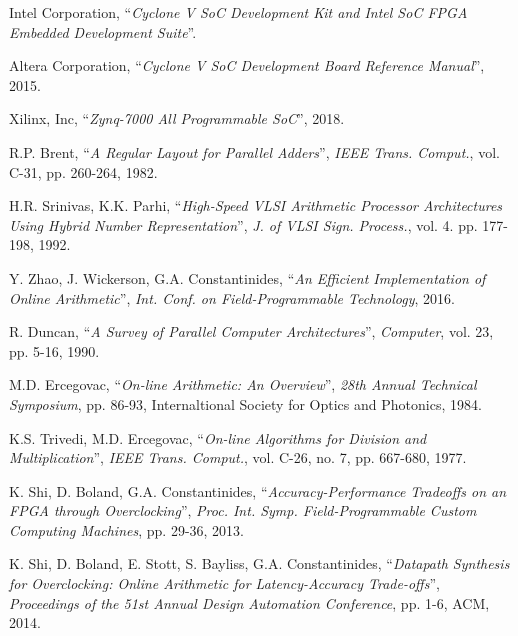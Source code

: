 \documentclass[journal]{IEEEtran}
\begin{document}
\begin{thebibliography}{1}

  Intel Corporation,
  ``\textit{Cyclone V SoC Development Kit and Intel SoC FPGA Embedded
  Development Suite}''.

  Altera Corporation,
  ``\textit{Cyclone V SoC Development Board Reference Manual}'',
  2015.

  Xilinx, Inc,
  ``\textit{Zynq-7000 All Programmable SoC}'',
  2018.

  R.P. Brent,
  ``\textit{A Regular Layout for Parallel Adders}'',
  \textit{IEEE Trans. Comput.}, vol. C-31, pp. 260-264,
  1982.

  H.R. Srinivas, K.K. Parhi,
  ``\textit{High-Speed VLSI Arithmetic Processor Architectures Using Hybrid
  Number Representation}'',
  \textit{J. of VLSI Sign. Process.}, vol. 4. pp. 177-198,
  1992.

  Y. Zhao, J. Wickerson, G.A. Constantinides,
  ``\textit{An Efficient Implementation of Online Arithmetic}'',
  \textit{Int. Conf. on Field-Programmable Technology},
  2016.

  R. Duncan,
  ``\textit{A Survey of Parallel Computer Architectures}'',
  \textit{Computer}, vol. 23, pp. 5-16,
  1990.

  M.D. Ercegovac,
  ``\textit{On-line Arithmetic: An Overview}'',
  \textit{28th Annual Technical Symposium}, pp. 86-93,
  Internaltional Society for Optics and Photonics,
  1984.

  K.S. Trivedi, M.D. Ercegovac,
  ``\textit{On-line Algorithms for Division and Multiplication}'',
  \textit{IEEE Trans. Comput.}, vol. C-26, no. 7, pp. 667-680,
  1977.

  K. Shi, D. Boland, G.A. Constantinides,
  ``\textit{Accuracy-Performance Tradeoffs on an FPGA through Overclocking}'',
  \textit{Proc. Int. Symp. Field-Programmable Custom Computing Machines},
  pp. 29-36,
  2013.

  K. Shi, D. Boland, E. Stott, S. Bayliss, G.A. Constantinides,
  ``\textit{Datapath Synthesis for Overclocking: Online Arithmetic for
  Latency-Accuracy Trade-offs}'',
  \textit{Proceedings of the 51st Annual Design Automation Conference},
  pp. 1-6, ACM,
  2014.

\end{thebibliography}
\end{document}
